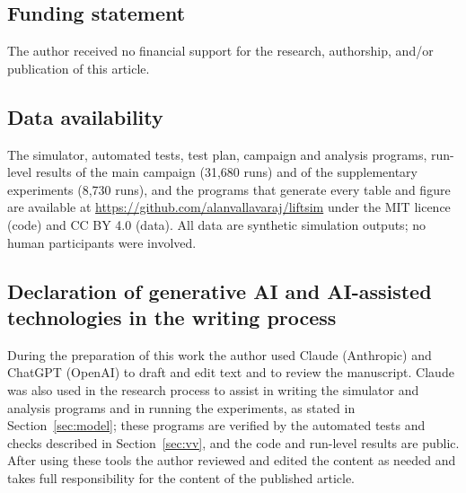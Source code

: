 \documentclass[12pt,a4paper]{article}
\begin{document}
\subsection*{Funding statement}
The author received no financial support for the research, authorship, and/or publication of this article.

\subsection*{Data availability}
The simulator, automated tests, test plan, campaign and analysis programs, run-level results of the main campaign (31,680 runs) and of the supplementary experiments (8,730 runs), and the programs that generate every table and figure are available at \url{https://github.com/alanvallavaraj/liftsim} \cite{dataset} under the MIT licence (code) and CC BY 4.0 (data). All data are synthetic simulation outputs; no human participants were involved.

\subsection*{Declaration of generative AI and AI-assisted technologies in the writing process}
During the preparation of this work the author used Claude (Anthropic) and ChatGPT (OpenAI) to draft and edit text and to review the manuscript. Claude was also used in the research process to assist in writing the simulator and analysis programs and in running the experiments, as stated in Section~\ref{sec:model}; these programs are verified by the automated tests and checks described in Section~\ref{sec:vv}, and the code and run-level results are public. After using these tools the author reviewed and edited the content as needed and takes full responsibility for the content of the published article.



\clearpage
\listoffigures
\listoftables

\clearpage\appendix
\renewcommand{\thesection}{Appendix \Alph{section}}

\end{document}
